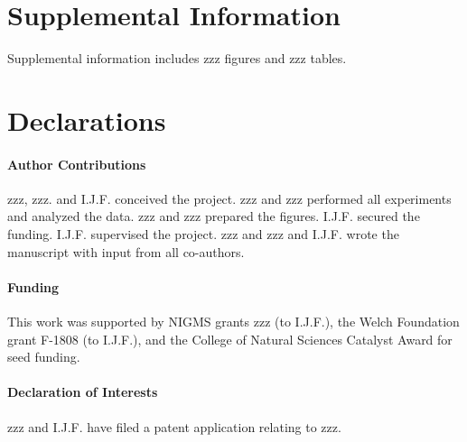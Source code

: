 \section*{Supplemental Information}

Supplemental information includes zzz figures and zzz tables. 

\section*{Declarations}

\paragraph{Author Contributions}

zzz, zzz. and I.J.F. conceived the project. zzz and zzz performed all
experiments and analyzed the data. zzz and zzz prepared the figures. I.J.F.
secured the funding. I.J.F. supervised the project. zzz and zzz and I.J.F. wrote the manuscript with input from all co-authors.

\paragraph{Funding}

This work was supported by NIGMS grants zzz (to I.J.F.), the Welch Foundation grant F-1808 (to I.J.F.), and the College of Natural Sciences Catalyst Award for seed funding. 

\paragraph{Declaration of Interests}
zzz and I.J.F. have filed a patent application relating to zzz. 

